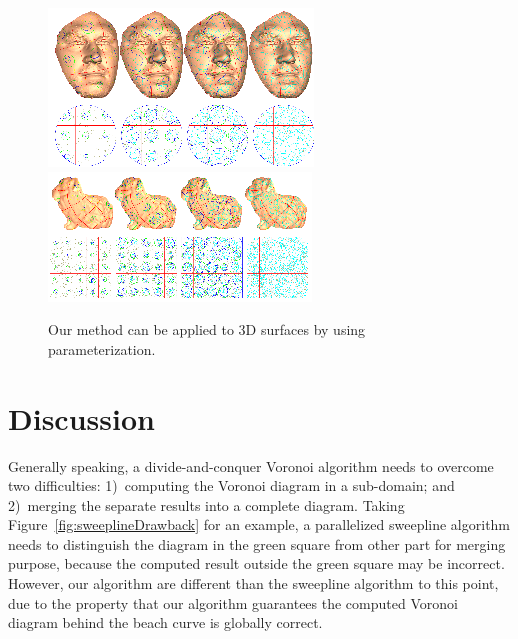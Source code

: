 {{\begin{figure}[!htbp]
\begin{center}
\includegraphics[width=0.925\linewidth]{figs/sweepcircle/dale.png}\\
\includegraphics[width=0.925\linewidth]{figs/sweepcircle/sheep.png}\\
\end{center}
\caption{Our method can be applied to 3D surfaces by using
parameterization.} \label{fig:3dresults}
\end{figure}



\vspace{-0.1in}
\section{Discussion}\label{sec:sweepcircle-discussion}
\vspace{-0.1in}
Generally speaking, a divide-and-conquer Voronoi algorithm needs to overcome
two difficulties: 1)~computing the Voronoi diagram in a sub-domain; and 2)~merging
the separate results into a complete diagram. Taking Figure~\ref{fig:sweeplineDrawback}
for an example, a parallelized sweepline algorithm needs to distinguish the diagram
in the green square from other part for merging purpose, because the computed result
outside the green square may be incorrect. However, our algorithm are different
than the sweepline algorithm to this point, due to the property that our algorithm
guarantees the computed Voronoi diagram behind the beach curve is globally correct.

}}
